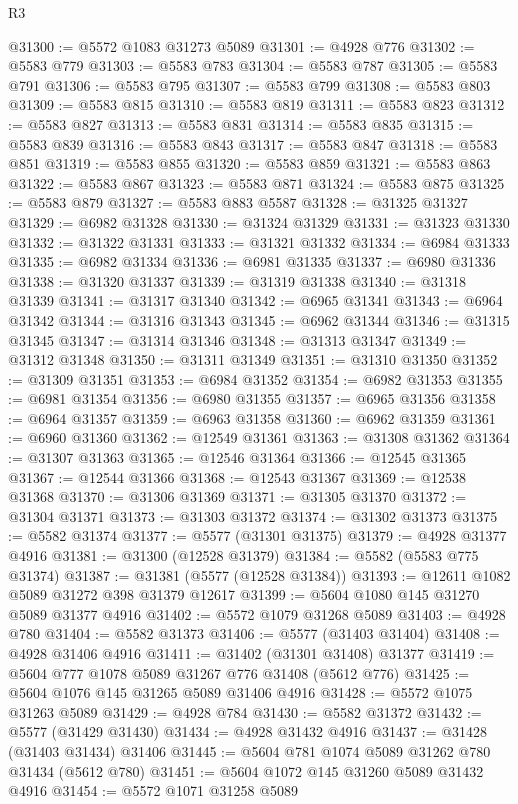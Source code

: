 \begin{lexlean}{R3}
\begin{coremodule}
@31300 := @5572 @1083 @31273 @5089
@31301 := @4928 @776
@31302 := @5583 @779
@31303 := @5583 @783
@31304 := @5583 @787
@31305 := @5583 @791
@31306 := @5583 @795
@31307 := @5583 @799
@31308 := @5583 @803
@31309 := @5583 @815
@31310 := @5583 @819
@31311 := @5583 @823
@31312 := @5583 @827
@31313 := @5583 @831
@31314 := @5583 @835
@31315 := @5583 @839
@31316 := @5583 @843
@31317 := @5583 @847
@31318 := @5583 @851
@31319 := @5583 @855
@31320 := @5583 @859
@31321 := @5583 @863
@31322 := @5583 @867
@31323 := @5583 @871
@31324 := @5583 @875
@31325 := @5583 @879
@31327 := @5583 @883 @5587
@31328 := @31325 @31327
@31329 := @6982 @31328
@31330 := @31324 @31329
@31331 := @31323 @31330
@31332 := @31322 @31331
@31333 := @31321 @31332
@31334 := @6984 @31333
@31335 := @6982 @31334
@31336 := @6981 @31335
@31337 := @6980 @31336
@31338 := @31320 @31337
@31339 := @31319 @31338
@31340 := @31318 @31339
@31341 := @31317 @31340
@31342 := @6965 @31341
@31343 := @6964 @31342
@31344 := @31316 @31343
@31345 := @6962 @31344
@31346 := @31315 @31345
@31347 := @31314 @31346
@31348 := @31313 @31347
@31349 := @31312 @31348
@31350 := @31311 @31349
@31351 := @31310 @31350
@31352 := @31309 @31351
@31353 := @6984 @31352
@31354 := @6982 @31353
@31355 := @6981 @31354
@31356 := @6980 @31355
@31357 := @6965 @31356
@31358 := @6964 @31357
@31359 := @6963 @31358
@31360 := @6962 @31359
@31361 := @6960 @31360
@31362 := @12549 @31361
@31363 := @31308 @31362
@31364 := @31307 @31363
@31365 := @12546 @31364
@31366 := @12545 @31365
@31367 := @12544 @31366
@31368 := @12543 @31367
@31369 := @12538 @31368
@31370 := @31306 @31369
@31371 := @31305 @31370
@31372 := @31304 @31371
@31373 := @31303 @31372
@31374 := @31302 @31373
@31375 := @5582 @31374
@31377 := @5577 (@31301 @31375)
@31379 := @4928 @31377 @4916
@31381 := @31300 (@12528 @31379)
@31384 := @5582 (@5583 @775 @31374)
@31387 := @31381 (@5577 (@12528 @31384))
@31393 := @12611 @1082 @5089 @31272 @398 @31379 @12617
@31399 := @5604 @1080 @145 @31270 @5089 @31377 @4916
@31402 := @5572 @1079 @31268 @5089
@31403 := @4928 @780
@31404 := @5582 @31373
@31406 := @5577 (@31403 @31404)
@31408 := @4928 @31406 @4916
@31411 := @31402 (@31301 @31408) @31377
@31419 := @5604 @777 @1078 @5089 @31267 @776 @31408 (@5612 @776)
@31425 := @5604 @1076 @145 @31265 @5089 @31406 @4916
@31428 := @5572 @1075 @31263 @5089
@31429 := @4928 @784
@31430 := @5582 @31372
@31432 := @5577 (@31429 @31430)
@31434 := @4928 @31432 @4916
@31437 := @31428 (@31403 @31434) @31406
@31445 := @5604 @781 @1074 @5089 @31262 @780 @31434 (@5612 @780)
@31451 := @5604 @1072 @145 @31260 @5089 @31432 @4916
@31454 := @5572 @1071 @31258 @5089

\end{coremodule}
\end{lexlean}
